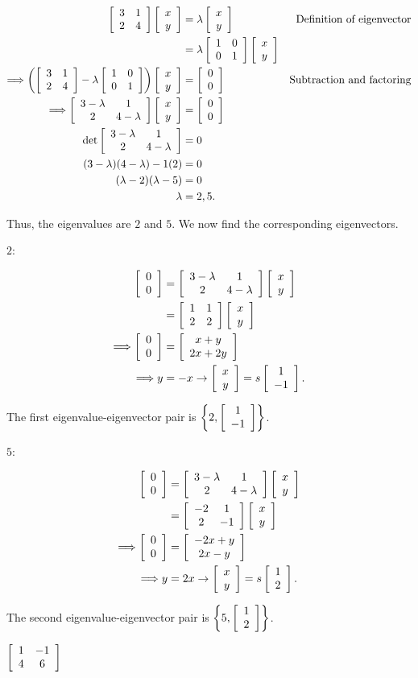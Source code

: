 \documentclass[../key.tex]{subfiles}
\begin{document}
\begin{align*}
\twomat{3}{1}{2}{4}\twovec{x}{y} &= \lambda\twovec{x}{y} & \text{Definition of eigenvector} \\
&= \lambda\twomat{1}{0}{0}{1}\twovec{x}{y} \\
\Longrightarrow \left(\twomat{3}{1}{2}{4}-\lambda\twomat{1}{0}{0}{1}\right)\twovec{x}{y}&=\twovec{0}{0} & \text{Subtraction and factoring} \\
\Longrightarrow \twomat{3-\lambda}{1}{2}{4-\lambda}\twovec{x}{y} &= \twovec{0}{0} \\
\det \twomat{3-\lambda}{1}{2}{4-\lambda} &= 0 \\
(3-\lambda)(4-\lambda)-1(2) &= 0 \\
(\lambda-2)(\lambda-5) &= 0 \\
\lambda &= 2,5.\\
\end{align*}

Thus, the eigenvalues are $2$ and $5$. We now find the corresponding eigenvectors.

$2$:

\begin{align*}
\twovec{0}{0} &= \twomat{3-\lambda}{1}{2}{4-\lambda}\twovec{x}{y} \\
&= \twomat{1}{1}{2}{2}\twovec{x}{y} \\
\Longrightarrow \twovec{0}{0} &= \twovec{x+y}{2x+2y} \\
\Longrightarrow y&=-x \rightarrow \twovec{x}{y}=s\twovec{1}{-1}.
\end{align*}

The first eigenvalue-eigenvector pair is $\left\{2, \twovec{1}{-1}\right\}$.

$5$:

\begin{align*}
\twovec{0}{0} &= \twomat{3-\lambda}{1}{2}{4-\lambda}\twovec{x}{y} \\
&= \twomat{-2}{1}{2}{-1}\twovec{x}{y} \\
\Longrightarrow \twovec{0}{0} &= \twovec{-2x+y}{2x-y} \\
\Longrightarrow y&=2x \rightarrow \twovec{x}{y}=s\twovec{1}{2}.
\end{align*}

The second eigenvalue-eigenvector pair is $\left\{5, \twovec{1}{2}\right\}$.

\begin{inner_problem}
\item $\twomat{1}{-1}{4}{6}$
\end{inner_problem}
\end{document}
